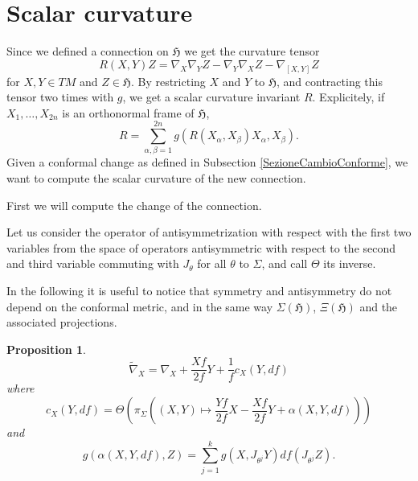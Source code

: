 \documentclass{article}
\newcommand{\g}[1]{\mathfrak{#1}}
\newcommand{\alfa}{\alpha}
\newtheorem{proposizione}{Proposition}[section]
\theoremstyle{definition}
\theoremstyle{remark}
\begin{document}
\section{Scalar curvature}\label{SezioneFormula}
Since we defined a connection on $\g{H}$ we get the curvature tensor
$$R(X,Y)Z = \nabla_X\nabla_YZ - \nabla_Y\nabla_XZ -\nabla_{[X,Y]}Z$$
for $X,Y\in TM$ and $Z\in\g{H}$.
By restricting $X$ and $Y$ to $\g{H}$, and contracting this tensor two times with $g$, we get a scalar curvature invariant $R$.
Explicitely, if $X_1,\ldots,X_{2n}$ is an orthonormal frame of $\g{H}$,
$$R = \sum_{\alfa,\beta=1}^{2n}g(R(X_{\alfa},X_{\beta})X_{\alfa},X_{\beta}). $$
Given a conformal change as defined in Subsection \ref{SezioneCambioConforme}, we want to compute the scalar curvature of the new connection.

First we will compute the change of the connection.

Let us consider the operator of antisymmetrization with respect with the first two variables from the space of operators antisymmetric with respect to the second and third variable commuting with $J_{\theta}$ for all $\theta$ to $\Sigma$, and call $\Theta$ its inverse.

In the following it is useful to notice that symmetry and antisymmetry do not depend on the conformal metric, and in the same way $\Sigma(\g{H})$, $\Xi(\g{H})$ and the associated projections.

\begin{proposizione}
 $$\widetilde{\nabla}_X = \nabla_X + \frac{Xf}{2f}Y + \frac{1}{f}c_X(Y,df)$$
 where
 $$c_X(Y,df) = \Theta\left(\pi_{\Sigma}\left((X,Y)\mapsto \frac{Yf}{2f}X -\frac{Xf}{2f}Y + \alfa(X,Y,df)\right)\right)$$
 and
 $$g(\alfa(X,Y,df),Z) = \sum_{j=1}^kg(X,J_{\theta^j}Y)df(J_{\theta^j}Z) . $$
\end{proposizione}
\end{document}
